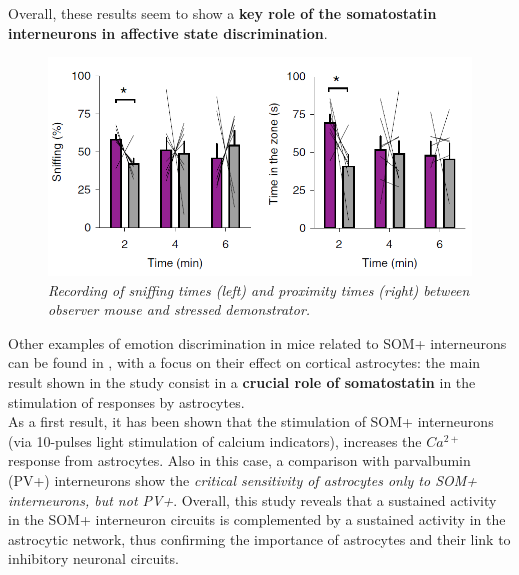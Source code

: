 \documentclass[12pt, a4paper]{report}
\begin{document}
 Overall, these results seem to show a \textbf{key role of the somatostatin interneurons in affective state discrimination}.

	\begin{figure}
	\begin{center}
		\includegraphics[scale=0.68]{scheggia.png} 
	\end{center} 
	\caption{\textit{Recording of sniffing times (left) and proximity times (right) between observer mouse and stressed demonstrator.}} \label{Scheggia}
	
\end{figure}


Other examples of emotion discrimination in mice related to SOM+ interneurons can be found in \cite{9}, %
 with a focus on their effect on cortical astrocytes: the main result shown in the study consist in a \textbf{crucial role of somatostatin} in the stimulation of responses by astrocytes.\\
As a first result, it has been shown that the stimulation of SOM+ interneurons (via 10-pulses light stimulation of calcium indicators), increases the $Ca^{2+}$ response from astrocytes. Also in this case, a comparison with parvalbumin (PV+) interneurons show the \textit{critical sensitivity of astrocytes only to SOM+ interneurons, but not PV+}. Overall, this study reveals that a sustained activity in the SOM+ interneuron circuits is complemented by
a sustained activity in the astrocytic network, thus confirming the importance of astrocytes and their link to inhibitory neuronal circuits. 
\\
\end{document}
